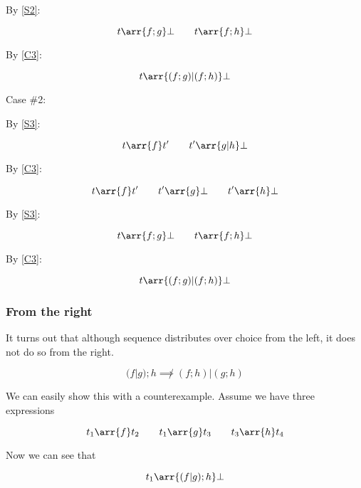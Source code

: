 By \eqref{S2}:

\begin{equation}
t \arr{f;g} \bot \qquad t \arr{f;h} \bot
\end{equation}

By \eqref{C3}:

\begin{equation}
t \arr{(f;g)|(f;h)} \bot
\end{equation}

Case \#2:

By \eqref{S3}:

\begin{equation}
t \arr{f} t' \qquad t' \arr{g|h} \bot
\end{equation}

By \eqref{C3}:

\begin{equation}
t \arr{f} t' \qquad t' \arr{g} \bot \qquad t' \arr{h} \bot
\end{equation}

By \eqref{S3}:

\begin{equation}
t \arr{f;g} \bot \qquad t \arr{f;h} \bot
\end{equation}

By \eqref{C3}:

\begin{equation}
t \arr{(f;g)|(f;h)} \bot
\end{equation}

\subsubsection{From the right}

It turns out that although sequence distributes over choice from
the left, it does not do so from the right.

\begin{equation}
\label{FROM_RIGHT}
(f|g);h \not\implies (f;h)|(g;h)
\end{equation}

We can easily show this with a counterexample. Assume we have
three expressions

\begin{equation}
t_1 \arr{f} t_2 \qquad t_1 \arr{g} t_3 \qquad t_3 \arr{h} t_4
\end{equation}

Now we can see that 

\begin{equation}
t_1 \arr{(f|g);h} \bot
\end{equation}

